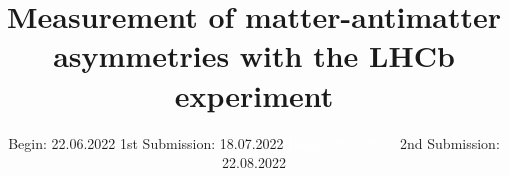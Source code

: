 


\title{Measurement of matter-antimatter asymmetries with the LHCb experiment}
\date{%
  Begin: 22.06.2022
  \hspace{3em}
   1st Submission:  18.07.2022
  \textcolor{white}{Begin: 29.11.2021} \hspace{3em} 2nd Submission: 22.08.2022
}



\maketitle
\thispagestyle{empty}
\tableofcontents
\newpage






\printbibliography{}


